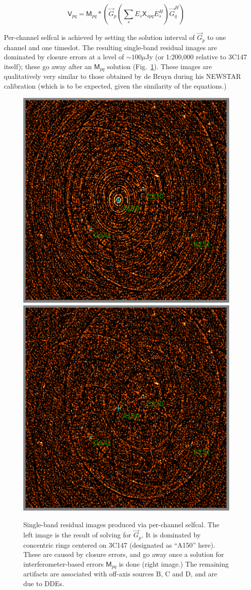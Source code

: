 \documentclass[]{aa}
\newcommand{\herm}{H}
\newcommand{\jones}[2]{\vec {#1}_{#2}}
\newcommand{\jonesT}[2]{\vec {#1}^{\herm}_{#2}}
\newcommand{\coh}[2]{\mathsf{{#1}}_{{#2}}}
\begin{document}
\begin{equation}\label{eq:3C147:perchan}
\coh{V}{pq} = \coh{M}{pq} \ast \left ( \jones{G}{p} \left( \sum_s E_s \coh{X}{spq} E^{\herm}_s \right)  \jonesT{G}{q} \right )
\end{equation}

Per-channel selfcal is achieved by setting the solution interval of $\jones{G}{p}$ to one channel and one timeslot. The resulting single-band residual images are dominated by closure errors at a level of $\sim 100\mu$Jy (or 1:200,000 relative to 3C147 itself); these go away after an $\coh{M}{pq}$ solution (Fig.~\ref{fig:Gsol}). These images are qualitatively very similar to those obtained by de Bruyn during his NEWSTAR calibration (which is to be expected, given the similarity of the equations.)

\begin{figure}
\begin{centering}
\includegraphics[width=.5\columnwidth]{G_solution}%
\includegraphics[width=.5\columnwidth]{IG_solution}\par
\end{centering}
\caption{\label{fig:Gsol}Single-band residual images produced via per-channel selfcal. The left image is the result of solving for $\jones{G}{p}$. It is dominated by concentric rings centered on 3C147 (designated as ``A150'' here). These are caused by closure errors, and go away once a solution for interferometer-based errors $\coh{M}{pq}$ is done (right image.) The remaining artifacts are associated with off-axis sources B, C and D, and are due to DDEs. 
}
\end{figure}
\end{document}
